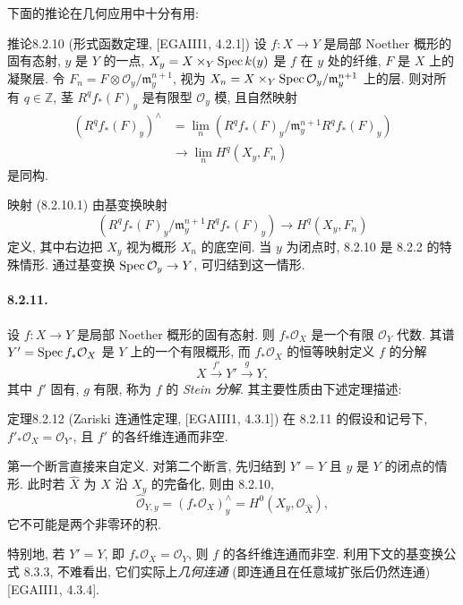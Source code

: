 下面的推论在几何应用中十分有用:
\begin{origstatement}{推论}{8.2.10}\label{ch08:cor8210}
(形式函数定理, [EGAIII1, 4.2.1]) 设 $f:X\to Y$ 是局部 Noether 概形的固有态射, $y$ 是 $Y$ 的一点, $X_y=X\times_Y\operatorname{Spec} k(y)$ 是 $f$ 在 $y$ 处的纤维, $F$ 是 $X$ 上的凝聚层. 令 $F_n=F\otimes\mathcal O_y/\mathfrak m_y^{n+1}$, 视为 $X_n=X\times_Y\operatorname{Spec}\mathcal O_y/\mathfrak m_y^{n+1}$ 上的层. 则对所有 $q\in\mathbb Z$, 茎 $R^qf_*(F)_y$ 是有限型 $\mathcal O_y$ 模, 且自然映射
\begin{equation}\begin{aligned}
(R^qf_*(F)_y)^\wedge
&=\lim_n(R^qf_*(F)_y/\mathfrak m_y^{n+1}R^qf_*(F)_y)\\
&\longrightarrow\lim_nH^q(X_y,F_n)
\end{aligned}\tag{8.2.10.1}\label{ch08:eq82101}\end{equation}
是同构.
\end{origstatement}
映射 (8.2.10.1) 由基变换映射
\[(R^qf_*(F)_y/\mathfrak m_y^{n+1}R^qf_*(F)_y)\longrightarrow H^q(X_y,F_n)\]
定义, 其中右边把 $X_y$ 视为概形 $X_n$ 的底空间. 当 $y$ 为闭点时, 8.2.10 是 8.2.2 的特殊情形. 通过基变换 $\operatorname{Spec}\mathcal O_y\to Y$, 可归结到这一情形.

\paragraph{8.2.11.}
设 $f:X\to Y$ 是局部 Noether 概形的固有态射. 则 $f_*\mathcal O_X$ 是一个有限 $\mathcal O_Y$ 代数. 其谱 $Y'=\operatorname{Spec} f_*\mathcal O_X$ 是 $Y$ 上的一个有限概形, 而 $f_*\mathcal O_X$ 的恒等映射定义 $f$ 的分解
\[X\xrightarrow{f'}Y'\xrightarrow{g}Y,\]
其中 $f'$ 固有, $g$ 有限, 称为 $f$ 的 \emph{Stein 分解}. 其主要性质由下述定理描述:

\begin{origstatement}{定理}{8.2.12}\label{ch08:th8212}
(Zariski 连通性定理, [EGAIII1, 4.3.1]) 在 8.2.11 的假设和记号下, $f'_*\mathcal O_X=\mathcal O_{Y'}$, 且 $f'$ 的各纤维连通而非空.
\end{origstatement}
第一个断言直接来自定义. 对第二个断言, 先归结到 $Y'=Y$ 且 $y$ 是 $Y$ 的闭点的情形. 此时若 $\widehat X$ 为 $X$ 沿 $X_y$ 的完备化, 则由 8.2.10,
\[\widehat{\mathcal O}_{Y,y}=(f_*\mathcal O_X)_y^\wedge=H^0(X_y,\mathcal O_{\widehat X}),\]
它不可能是两个非零环的积.

特别地, 若 $Y'=Y$, 即 $f_*\mathcal O_X=\mathcal O_Y$, 则 $f$ 的各纤维连通而非空. 利用下文的基变换公式 8.3.3, 不难看出,
它们实际上\emph{几何连通} (即连通且在任意域扩张后仍然连通) [EGAIII1, 4.3.4].

